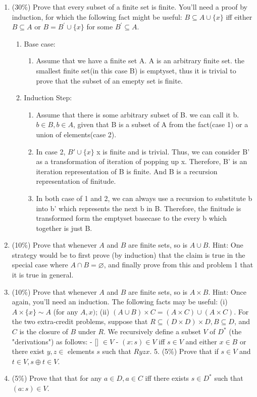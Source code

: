 \documentclass[10pt]{article}
\begin{document}
\begin{enumerate}
\begin{enumerate}
    \end{enumerate}
    \item (30\%) Prove that every subset of a finite set is finite.
    You'll need a proof by induction, for which the following fact might be useful: $B \subseteq A \cup\{x\}$ iff either $B \subseteq A$ or $B=B^{\prime} \cup\{x\}$ for some $B^{\prime} \subseteq A$.
    \begin{enumerate}
    \item Base case:
    \begin{enumerate}
        \item Assume that we have a finite set A. A is an arbitrary finite set. the smallest finite set(in this case B) is emptyset, thus it is trivial to prove that the subset of an emepty set is finite.
    \end{enumerate}
    \item Induction Step:
    \begin{enumerate}
        \item Assume that there is some arbitrary subset of B. we can call it b. $b \in B, b \in A$, given that B is a subset of A from the fact(case 1) or a union of elements(case 2). 
        \item In case 2, $B' \cup \{x\}$ x is finite and is trivial. Thus, we can consider B' as a transformation of iteration of popping up x. Therefore, B' is an iteration representation of B is finite. And B is a recursion representation of finitude. 
        \item In both case of 1 and 2, we can always use a recursion to substitute b into b' which represents the next b in B. Therefore, the finitude is transformed form the emptyset basecase to the every b which together is just B. 
    \end{enumerate}
    \end{enumerate}
    \item (10\%) Prove that whenever $A$ and $B$ are finite sets, so is $A \cup B$.
    Hint: One strategy would be to first prove (by induction) that the claim is true in the special case where $A \cap B=\varnothing$, and finally prove from this and problem 1 that it is true in general.
    \item (10\%) Prove that whenever $A$ and $B$ are finite sets, so is $A \times B$.
    Hint: Once again, you'll need an induction. The following facts may be useful: (i) $A \times\{x\} \sim A$ (for any $A, x)$; (ii) $(A \cup B) \times C=(A \times C) \cup(A \times C)$.
    For the two extra-credit problems, suppose that $R \subseteq(D \times D) \times D, B \subseteq D$, and $C$ is the closure of $B$ under $R$. We recursively define a subset $V$ of $D^*$ (the "derivations") as follows:
    - [] $\in V$
    - $(x: s) \in V$ iff $s \in V$ and either $x \in B$ or there exist $y, z \in$ elements $s$ such that $R y z x$.
    5. (5\%) Prove that if $s \in V$ and $t \in V, s \oplus t \in V$.
    \item (5\%) Prove that that for any $a \in D, a \in C$ iff there exists $s \in D^*$ such that $(a: s) \in V$.
\end{enumerate}
\end{document}
